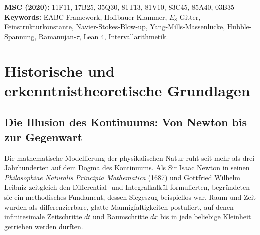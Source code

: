 \documentclass[11pt,a4paper]{article}
\theoremstyle{definition}
\theoremstyle{remark}
\numberwithin{equation}{section}
\begin{document}
\begin{abstract}
Wir zeigen im Weiteren, wie dieses diskrete Fundament zwei der prominentesten Millennium-Probleme des Clay Mathematics Institute löst: Die Finite-Time-Singularität der Navier-Stokes-Gleichungen entpuppt sich als hydrodynamische Ultraviolett-Katastrophe, die an der Gittergrenze $\ell_P$ durch die Hoffbauer-Klammer verlustfrei in orthogonale oktonionische Freiheitsgrade absorbiert wird. Zugleich wird die Yang-Mills-Massenlücke als strikt positives Casimir-Eigenwert-Intervall $\Delta_{\mathrm{YM}} > 0$ der Hoffbauer-Klammer bewiesen, da eine Kompensation zwischen $\mathbb{Q}(\sqrt{5})$ und $\mathbb{Q}$ algebraisch ausgeschlossen ist. 
Abschließend eliminieren wir sämtliche 25+ freien Parameter des Standardmodells und des $\Lambda\mathrm{CDM}$-Modells, lösen die Hubble-Spannung über den topologischen Skalensprung $(12/\sqrt{\alpha^{-1}})^3 \approx 1{,}0772$ auf $H_0 \approx 72{,}6\ \text{km/s/Mpc}$ auf, erklären die drei Fermion-Generationen via $Spin(8)$-Trialität und berechnen die leptonischen $g-2$-Anomalien geschlossen aus der Spinor-Holonomie.
\end{abstract}

\vspace{1em}
\noindent\textbf{MSC (2020):} 11F11, 17B25, 35Q30, 81T13, 81V10, 83C45, 85A40, 03B35 \\
\textbf{Keywords:} EABC-Framework, Hoffbauer-Klammer, $E_8$-Gitter, Feinstrukturkonstante, Navier-Stokes-Blow-up, Yang-Mills-Massenlücke, Hubble-Spannung, Ramanujan-$\tau$, Lean 4, Intervallarithmetik.

\newpage
\tableofcontents
\newpage

\section{Historische und erkenntnistheoretische Grundlagen}

\subsection{Die Illusion des Kontinuums: Von Newton bis zur Gegenwart}

Die mathematische Modellierung der physikalischen Natur ruht seit mehr als drei Jahrhunderten auf dem Dogma des Kontinuums. Als Sir Isaac Newton in seinen \emph{Philosophiae Naturalis Principia Mathematica} (1687) und Gottfried Wilhelm Leibniz zeitgleich den Differential- und Integralkalkül formulierten, begründeten sie ein methodisches Fundament, dessen Siegeszug beispiellos war. Raum und Zeit wurden als differenzierbare, glatte Mannigfaltigkeiten postuliert, auf denen infinitesimale Zeitschritte $dt$ und Raumschritte $dx$ bis in jede beliebige Kleinheit getrieben werden durften. 
\end{document}

